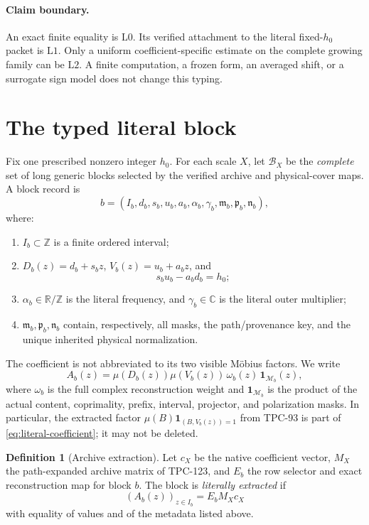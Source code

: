 \documentclass[11pt]{article}
\theoremstyle{definition}
\newtheorem{definition}[theorem]{Definition}
\theoremstyle{remark}
\newcommand{\C}{\mathbb C}
\newcommand{\Lzero}{\mathrm{L0}}
\newcommand{\Lone}{\mathrm{L1}}
\newcommand{\Ltwo}{\mathrm{L2}}
\begin{document}
\paragraph{Claim boundary.}
An exact finite equality is \(\Lzero\).  Its verified attachment to
the literal fixed-\(h_0\) packet is \(\Lone\).  Only a uniform
coefficient-specific estimate on the complete growing family can be
\(\Ltwo\).  A finite computation, a frozen form, an averaged shift,
or a surrogate sign model does not change this typing.

\section{The typed literal block}

Fix one prescribed nonzero integer \(h_0\).  For each scale \(X\), let
\(\mathcal B_X\) be the \emph{complete} set of long generic blocks
selected by the verified archive and physical-cover maps.  A block
record is
\[
 b=(I_b,d_b,s_b,u_b,a_b,\alpha_b,\gamma_b,\mathfrak m_b,
    \mathfrak p_b,\mathfrak n_b),
\]
where:
\begin{enumerate}[label=(\roman*),leftmargin=2.2em]
\item \(I_b\subset\mathbb Z\) is a finite ordered interval;
\item
  \(D_b(z)=d_b+s_bz\), \(V_b(z)=u_b+a_bz\), and
  \[
    s_bu_b-a_bd_b=h_0;
    \label{eq:determinant}
  \]
\item \(\alpha_b\in\mathbb R/\mathbb Z\) is the literal frequency,
  and \(\gamma_b\in\C\) is the literal outer multiplier;
\item \(\mathfrak m_b,\mathfrak p_b,\mathfrak n_b\) contain,
  respectively, all masks, the path/provenance key, and the unique
  inherited physical normalization.
\end{enumerate}
The coefficient is not abbreviated to its two visible M\"obius
factors.  We write
\begin{equation}
 A_b(z)
 =
 \mu(D_b(z))\mu(V_b(z))\,
 \omega_b(z)\,
 \mathbf 1_{\mathcal M_b}(z),
 \label{eq:literal-coefficient}
\end{equation}
where \(\omega_b\) is the full complex reconstruction weight and
\(\mathbf 1_{\mathcal M_b}\) is the product of the actual content,
coprimality, prefix, interval, projector, and polarization masks.
In particular, the extracted factor
\(\mu(B)\mathbf 1_{(B,V_b(z))=1}\) from TPC-93 is part of
\eqref{eq:literal-coefficient}; it may not be deleted.

\begin{definition}[Archive extraction]
Let \(c_X\) be the native coefficient vector, \(M_X\) the
path-expanded archive matrix of TPC-123, and \(E_b\) the row selector
and exact reconstruction map for block \(b\).  The block is
\emph{literally extracted} if
\begin{equation}
 (A_b(z))_{z\in I_b}=E_bM_Xc_X
 \label{eq:archive-extraction}
\end{equation}
with equality of values and of the metadata listed above.
\end{definition}
\end{document}
